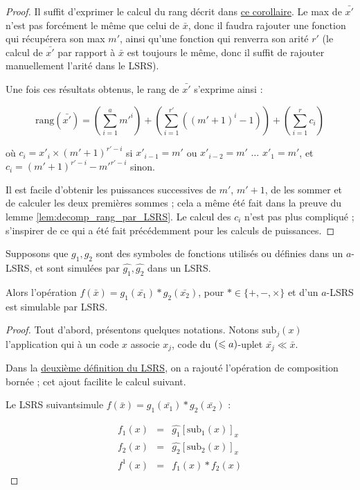 	\begin{proof}
		Il suffit d'exprimer le calcul du rang décrit dans \hyperref[coro:rang_bon_ordre]{ce corollaire}. Le max de $\bar{x'}$ n'est pas forcément le même que celui de $\bar{x}$, donc il faudra rajouter une fonction qui récupérera son max $m'$, ainsi qu'une fonction qui renverra son arité $r'$ (le calcul de $\bar{x'}$ par rapport à $\bar{x}$ est toujours le même, donc il suffit de rajouter manuellement l'arité dans le LSRS). 
		
		Une fois ces résultats obtenus, le rang de $\bar{x'}$ s'exprime ainsi :
		
		\begin{equation}
			\text{rang}\left(\bar{x'}\right) = \left( \sum_{i=1}^{a} m'^i \right) + \left( \sum_{i=1}^{r'} \left( \left(m'+1\right)^i -1 \right) \right) + \left(\sum_{i=1}^{r} c_i \right)
		\end{equation}
		
		où $c_i = x'_i \times \left(m'+1\right)^{r'-i}$ si $x'_{i-1} = m'$ ou $x'_{i-2} = m'$ $\dots$ $x'_{1} = m'$, et $c_i = \left(m'+1\right)^{r'-i}-m'^{r'-i}$ sinon.
		
		Il est facile d'obtenir les puissances successives de $m'$, $m'+1$, de les sommer et de calculer les deux premières sommes ; cela a même été fait dans la preuve du lemme \ref{lem:decomp_rang_par_LSRS}. Le calcul des $c_i$ n'est pas plus compliqué ; s'inspirer de ce qui a été fait précédemment pour les calculs de puissances.
	\end{proof}
	
	
	\begin{lemma}
		\label{lem:operation_simulable}
		Supposons que $g_1, g_2$ sont des symboles de fonctions utilisés ou définies dans un $a$-LSRS, et sont simulées par $\hat{g_1},\hat{g_2}$ dans un LSRS.
		
		Alors l'opération $f\left(\bar{x}\right) = g_1\left(\bar{x_1}\right) * g_2\left(\bar{x_2}\right)$, pour $* \in \{+, -, \times \}$ et d'un $a$-LSRS est simulable par LSRS.
	\end{lemma}
	
	\begin{proof}
		Tout d'abord, présentons quelques notations. Notons $\text{sub}_j(x)$ l'application qui à un code $x$ associe $x_j$, code du $\left( \leqslant a \right)$-uplet $\bar{x_j} \ll \bar{x}$. 
		
		Dans la \hyperref[def:LSRS_2]{deuxième définition du LSRS}, on a rajouté l'opération de composition bornée ; cet ajout facilite le calcul suivant. 
		
		Le LSRS suivant\footnotemark  simule $f\left(\bar{x}\right) = g_1\left(\bar{x_1}\right) * g_2\left(\bar{x_2}\right)$ :
			
		
		\begin{eqnarray}
			f_1(x) & = & \hat{g_1}\left[ \text{sub}_1(x) \right]_x \\
			f_2(x) & = & \hat{g_2}\left[ \text{sub}_2(x) \right]_x \\
			f^1(x) & = & f_1(x) * f_2(x) 
		\end{eqnarray}
	\end{proof}
	

